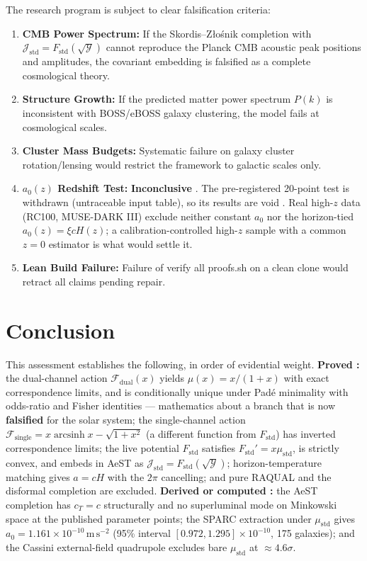 \documentclass[aps,prd,preprint,superscriptaddress,nofootinbib,amsmath,amssymb,floatfix]{revtex4-2}
\makeatletter
\DeclareRobustCommand{\rntexttt}[1]{%
  \ifmmode
    \nfss@text{\ttfamily\hyphenchar\font=-1 #1}%
  \else
    \hmode@bgroup\ttfamily\hyphenchar\font=-1 #1\egroup
  \fi}
\DeclareRobustCommand{\_}{%
    \ifmmode\nfss@text{\textunderscore}\else\textunderscore\penalty\z@\fi}%
\let\texttt\rntexttt
\makeatother
\begin{document}
The research program is subject to clear falsification criteria:
\begin{enumerate}
    \item \textbf{CMB Power Spectrum:} If the Skordis--Z\l{}o\'snik completion with $\mathcal{J}_{\text{std}} = F_{\text{std}}(\sqrt{\mathcal{Y}})$ cannot reproduce the Planck CMB acoustic peak positions and amplitudes, the covariant embedding is falsified as a complete cosmological theory.
    \item \textbf{Structure Growth:} If the predicted matter power spectrum $P(k)$ is inconsistent with BOSS/eBOSS galaxy clustering, the model fails at cosmological scales.
    \item \textbf{Cluster Mass Budgets:} Systematic failure on galaxy cluster rotation/lensing would restrict the framework to galactic scales only.
    \item \textbf{$a_0(z)$ Redshift Test:} \textbf{Inconclusive} . The pre-registered 20-point test is withdrawn (untraceable input table), so its results are void . Real high-$z$ data (RC100, MUSE-DARK III) exclude neither constant $a_0$ nor the horizon-tied $a_0(z) = \xi c H(z)$; a calibration-controlled high-$z$ sample with a common $z=0$ estimator is what would settle it.
    \item \textbf{Lean Build Failure:} Failure of \texttt{verify\_all\_proofs.sh} on a clean clone would retract all  claims pending repair.
\end{enumerate}

\section{Conclusion}
\label{sec:conclusion}

This assessment establishes the following, in order of evidential weight. \textbf{Proved :} the dual-channel action $\mathcal{F}_{\text{dual}}(x)$ yields $\mu(x) = x/(1+x)$ with exact correspondence limits, and is conditionally unique under Pad\'e minimality with odds-ratio and Fisher identities --- mathematics about a branch that is now \textbf{falsified} for the solar system; the single-channel action $\mathcal{F}_{\text{single}} = x\operatorname{arcsinh}x - \sqrt{1+x^2}$ (a different function from $F_{\text{std}}$) has inverted correspondence limits; the live potential $F_{\text{std}}$ satisfies $F_{\text{std}}' = x\mu_{\text{std}}$, is strictly convex, and embeds in AeST as $\mathcal{J}_{\text{std}} = F_{\text{std}}(\sqrt{\mathcal{Y}})$; horizon-temperature matching gives $a = cH$ with the $2\pi$ cancelling; and pure RAQUAL and the disformal completion are excluded. \textbf{Derived or computed :} the AeST completion has $c_T = c$ structurally and no superluminal mode on Minkowski space at the published parameter points; the SPARC extraction under $\mu_{\text{std}}$ gives $a_0 = 1.161\times10^{-10}\,\mathrm{m\,s^{-2}}$ (95\% interval $[0.972, 1.295]\times10^{-10}$, 175 galaxies); and the Cassini external-field quadrupole excludes bare $\mu_{\text{std}}$ at $\approx 4.6\sigma$.
\end{document}
